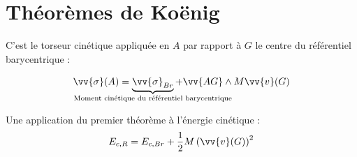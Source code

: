 \documentclass[11pt,a4paper,fleqn,pdftex]{report}
\begin{document}
\section{Théorèmes de Koënig}
\begin{itheorem}
C'est le torseur cinétique appliquée en $A$ par rapport à $G$ le centre du  référentiel barycentrique : \\
\begin{center}
\begin{equation}
\vv{\sigma}(A)=\underbrace{\vv{\sigma}_{Br}}_{\mathclap{\text{Moment cinétique du référentiel barycentrique}}}+\vv{AG}\wedge{}M\vv{v}(G)
\end{equation}
\end{center}
\end{itheorem}
\begin{theorem}
Une application du premier théorème à l'énergie cinétique :\\
\begin{equation}
E_{c,R}=E_{c,Br}+\frac{1}{2}M\left(\vv{v}(G)\right)^2
\end{equation}
\end{theorem}
\end{document}
